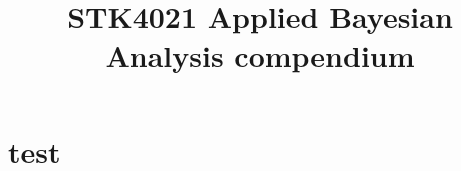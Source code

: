 \documentclass{article}
\title{STK4021 Applied Bayesian Analysis compendium}
\begin{document}
    \maketitle

    \tableofcontents

    \section{test}
\end{document}
